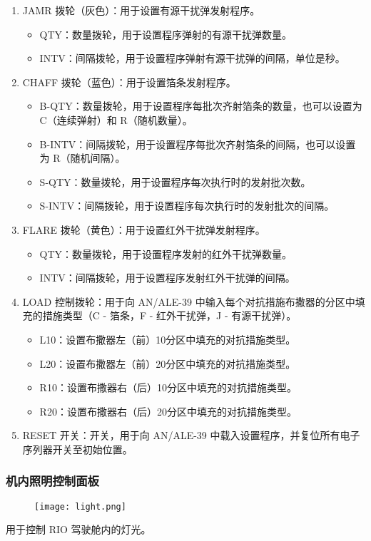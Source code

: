 \begin{enumerate}
	\item JAMR 拨轮（灰色）：用于设置有源干扰弹发射程序。
	      \begin{itemize}
		      \item QTY：数量拨轮，用于设置程序弹射的有源干扰弹数量。
		      \item INTV：间隔拨轮，用于设置程序弹射有源干扰弹的间隔，单位是秒。
	      \end{itemize}
	\item CHAFF 拨轮（蓝色）：用于设置箔条发射程序。
	      \begin{itemize}
		      \item B-QTY：数量拨轮，用于设置程序每批次齐射箔条的数量，也可以设置为 C（连续弹射）和 R（随机数量）。
		      \item B-INTV：间隔拨轮，用于设置程序每批次齐射箔条的间隔，也可以设置为 R（随机间隔）。
		      \item S-QTY：数量拨轮，用于设置程序每次执行时的发射批次数。
		      \item S-INTV：间隔拨轮，用于设置程序每次执行时的发射批次的间隔。
	      \end{itemize}
	\item FLARE 拨轮（黄色）：用于设置红外干扰弹发射程序。
	      \begin{itemize}
		      \item QTY：数量拨轮，用于设置程序发射的红外干扰弹数量。
		      \item INTV：间隔拨轮，用于设置程序发射红外干扰弹的间隔。
	      \end{itemize}
	\item LOAD 控制拨轮：用于向 AN/ALE-39 中输入每个对抗措施布撒器的分区中填充的措施类型（C - 箔条，F - 红外干扰弹，J - 有源干扰弹）。
	      \begin{itemize}
		      \item L10：设置布撒器左（前）10分区中填充的对抗措施类型。
		      \item L20：设置布撒器左（前）20分区中填充的对抗措施类型。
		      \item R10：设置布撒器右（后）10分区中填充的对抗措施类型。
		      \item R20：设置布撒器右（后）20分区中填充的对抗措施类型。
	      \end{itemize}
	\item RESET 开关：开关，用于向 AN/ALE-39 中载入设置程序，并复位所有电子序列器开关至初始位置。
\end{enumerate}

\subsubsection{机内照明控制面板}
\begin{figure}[htb]
	\centering
	\texttt{[image: light.png]}
\end{figure}
用于控制 RIO 驾驶舱内的灯光。


